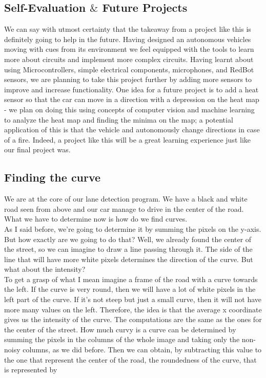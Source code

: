 \documentclass[12pt,a4paper]{article}
\begin{document}
\begin{large}
\section{Self-Evaluation $\&$ Future Projects}
We can say with utmost certainty that the takeaway from a project like this is definitely going to help in the future. Having designed an autonomous vehicles moving with cues from its environment we feel equipped with the tools to learn more about circuits and implement more complex circuits. Having learnt about using Microcontrollers, simple electrical components, microphones, and RedBot sensors, we are planning to take this project further by adding more sensors to improve and increase functionality. One idea for a future project is to add a heat sensor so that the car can move in a direction with a depression on the heat map - we plan on doing this using concepts of computer vision and machine learning to analyze the heat map and finding the minima on the map; a potential application of this is that the vehicle and autonomously change directions in case of a fire. Indeed, a project like this will be a great learning experience just like our final project was. \\

\subsection{Finding the curve}
We are at the core of our lane detection program. We have a black and white road seen from above and our car manage to drive in the center of the road. What we have to determine now is how do we find curves.\\
As I said before, we're going to determine it by summing the pixels on the y-axis. But how exactly are we going to do that? Well, we already found the center of the street, so we can imagine to draw a line passing through it. The side of the line that will have more white pixels determines the direction of the curve. But what about the intensity?\\
To get a grasp of what I mean imagine a frame of the road with a curve towards the left. If the curve is very round, then we will have a lot of white pixels in the left part of the curve. If it's not steep but just a small curve, then it will not have more many values on the left. Therefore, the idea is that the average x coordinate gives us the intensity of the curve. The computations are the same as the ones for the center of the street. How much curvy is a curve can be determined by summing the pixels in the columns of the whole image and taking only the non-noisy columns, as we did before. Then we can obtain, by subtracting this value to the one that represent the center of the road, the roundedness of the curve, that is represented by 



\end{large}
\end{document}
